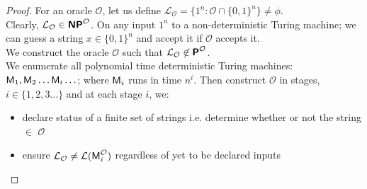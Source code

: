 \documentclass[usletter]{article}
\newcommand{\collection}[1]
           {\ensuremath{\mathcal{#1}}}
\newcommand{\machine}[1]
           {\ensuremath{\textnormal{\textsf{#1}}}}
\newcommand{\family}[1]
           {\ensuremath{\textnormal{\textsf{\textbf{#1}}}}}
\begin{document}
\begin{proof}
For an oracle \collection{O}, let us define $\collection{L}_\collection{O} = \{ 1^n : \collection{O} \cap \{0,1\}^n \} \neq \phi$. \\
Clearly, $\collection{L}_\collection{O} \in \family{NP}^\collection{O}$. On any input $1^n$ to a non-deterministic Turing machine; we can guess a string $x \in \{0,1\}^n$ and accept it if \collection{O} accepts it. \\

\noindent
We construct the oracle \collection{O} such that $\collection{L}_\collection{O} \not\in \family{P}^\collection{O}$. \\
We enumerate all polynomial time deterministic Turing machines: $\machine{M}_1, \machine{M}_2 \ldots \machine{M}_i \ldots$; where $\machine{M}_i$ runs in time $n^i$. Then construct \collection{O} in stages, $i \in \{1, 2, 3 \ldots\}$ and at each stage $i$, we:
\begin{itemize}
  \item declare status of a finite set of strings i.e. determine whether or not the string $\in$ \collection{O}
  \item ensure $\collection{L}_\collection{O} \neq \collection{L}(\machine{M}_i^\collection{O})$ regardless of yet to be declared inputs
\end{itemize}


\end{proof}
\end{document}
